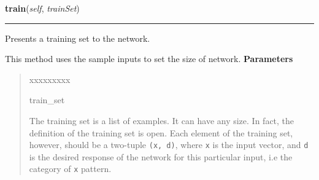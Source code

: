 \hspace{.8\funcindent}\begin{boxedminipage}{\funcwidth}

    \raggedright \textbf{train}(\textit{self}, \textit{trainSet})

    \vspace{-1.5ex}

    \rule{\textwidth}{0.5\fboxrule}
\setlength{\parskip}{2ex}

Presents a training set to the network.

This method uses the sample inputs to set the size of network.
\setlength{\parskip}{1ex}
      \textbf{Parameters}
      \vspace{-1ex}

      \begin{quote}
        \begin{Ventry}{xxxxxxxxx}

          \item[train\_set]


The training set is a list of examples. It can have any size. In
fact, the definition of the training set is open. Each element of
the training set, however, should be a two-tuple \texttt{(x, d)}, where
\texttt{x} is the input vector, and \texttt{d} is the desired response of the
network for this particular input, i.e the category of \texttt{x}
pattern.
        \end{Ventry}

      \end{quote}

    \end{boxedminipage}

    \label{peach:nn:nnet:PNN:__call__}

    \vspace{0.5ex}

